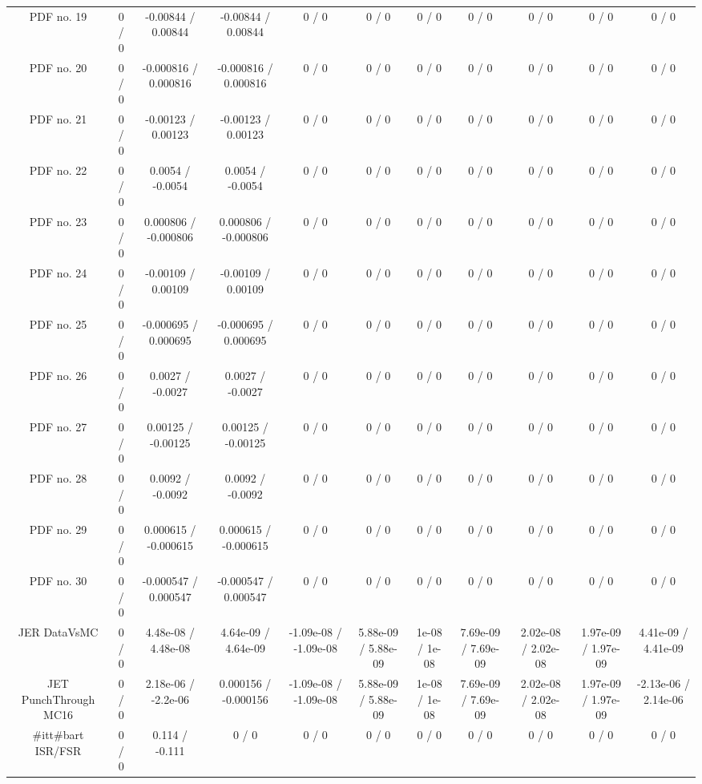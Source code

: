 \begin{table}[htbp]
\begin{center}
\begin{tabular}{|c|c|c|c|c|c|c|c|c|c|c|}
  PDF no. 19 & 0 / 0 & -0.00844 / 0.00844 & -0.00844 / 0.00844 & 0 / 0 & 0 / 0 & 0 / 0 & 0 / 0 & 0 / 0 & 0 / 0 & 0 / 0 \\ 
  PDF no. 20 & 0 / 0 & -0.000816 / 0.000816 & -0.000816 / 0.000816 & 0 / 0 & 0 / 0 & 0 / 0 & 0 / 0 & 0 / 0 & 0 / 0 & 0 / 0 \\ 
  PDF no. 21 & 0 / 0 & -0.00123 / 0.00123 & -0.00123 / 0.00123 & 0 / 0 & 0 / 0 & 0 / 0 & 0 / 0 & 0 / 0 & 0 / 0 & 0 / 0 \\ 
  PDF no. 22 & 0 / 0 & 0.0054 / -0.0054 & 0.0054 / -0.0054 & 0 / 0 & 0 / 0 & 0 / 0 & 0 / 0 & 0 / 0 & 0 / 0 & 0 / 0 \\ 
  PDF no. 23 & 0 / 0 & 0.000806 / -0.000806 & 0.000806 / -0.000806 & 0 / 0 & 0 / 0 & 0 / 0 & 0 / 0 & 0 / 0 & 0 / 0 & 0 / 0 \\ 
  PDF no. 24 & 0 / 0 & -0.00109 / 0.00109 & -0.00109 / 0.00109 & 0 / 0 & 0 / 0 & 0 / 0 & 0 / 0 & 0 / 0 & 0 / 0 & 0 / 0 \\ 
  PDF no. 25 & 0 / 0 & -0.000695 / 0.000695 & -0.000695 / 0.000695 & 0 / 0 & 0 / 0 & 0 / 0 & 0 / 0 & 0 / 0 & 0 / 0 & 0 / 0 \\ 
  PDF no. 26 & 0 / 0 & 0.0027 / -0.0027 & 0.0027 / -0.0027 & 0 / 0 & 0 / 0 & 0 / 0 & 0 / 0 & 0 / 0 & 0 / 0 & 0 / 0 \\ 
  PDF no. 27 & 0 / 0 & 0.00125 / -0.00125 & 0.00125 / -0.00125 & 0 / 0 & 0 / 0 & 0 / 0 & 0 / 0 & 0 / 0 & 0 / 0 & 0 / 0 \\ 
  PDF no. 28 & 0 / 0 & 0.0092 / -0.0092 & 0.0092 / -0.0092 & 0 / 0 & 0 / 0 & 0 / 0 & 0 / 0 & 0 / 0 & 0 / 0 & 0 / 0 \\ 
  PDF no. 29 & 0 / 0 & 0.000615 / -0.000615 & 0.000615 / -0.000615 & 0 / 0 & 0 / 0 & 0 / 0 & 0 / 0 & 0 / 0 & 0 / 0 & 0 / 0 \\ 
  PDF no. 30 & 0 / 0 & -0.000547 / 0.000547 & -0.000547 / 0.000547 & 0 / 0 & 0 / 0 & 0 / 0 & 0 / 0 & 0 / 0 & 0 / 0 & 0 / 0 \\ 
  JER DataVsMC & 0 / 0 & 4.48e-08 / 4.48e-08 & 4.64e-09 / 4.64e-09 & -1.09e-08 / -1.09e-08 & 5.88e-09 / 5.88e-09 & 1e-08 / 1e-08 & 7.69e-09 / 7.69e-09 & 2.02e-08 / 2.02e-08 & 1.97e-09 / 1.97e-09 & 4.41e-09 / 4.41e-09 \\ 
  JET PunchThrough MC16 & 0 / 0 & 2.18e-06 / -2.2e-06 & 0.000156 / -0.000156 & -1.09e-08 / -1.09e-08 & 5.88e-09 / 5.88e-09 & 1e-08 / 1e-08 & 7.69e-09 / 7.69e-09 & 2.02e-08 / 2.02e-08 & 1.97e-09 / 1.97e-09 & -2.13e-06 / 2.14e-06 \\ 
  #it{t#bar{t}} ISR/FSR & 0 / 0 & 0.114 / -0.111 & 0 / 0 & 0 / 0 & 0 / 0 & 0 / 0 & 0 / 0 & 0 / 0 & 0 / 0 & 0 / 0 \\ 

\end{tabular}
\end{center}
\end{table}
